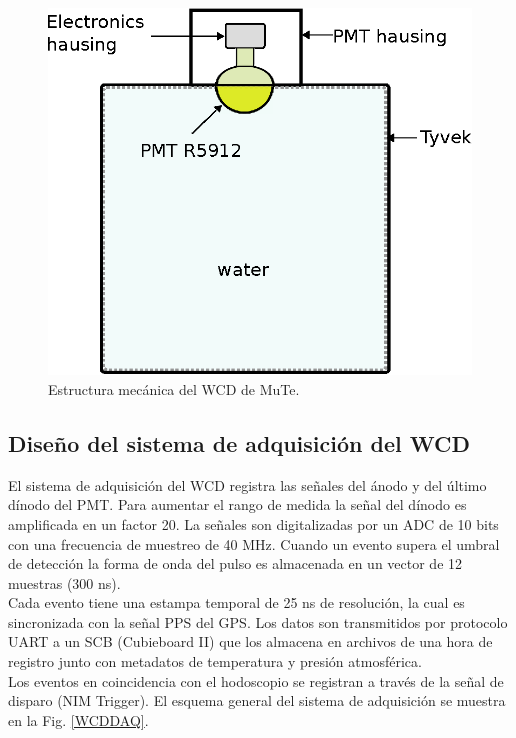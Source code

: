 \begin{figure}[h!]
\centering
\includegraphics[scale=1]{Figures/WCD.eps}
\caption{Estructura mecánica del WCD de MuTe.}
\label{WCD}
\end{figure}

\subsection{Diseño del sistema de adquisición del WCD}

El sistema de adquisición del WCD registra las señales del ánodo y del último dínodo del PMT. Para aumentar el rango de medida la señal del dínodo es amplificada en un factor 20. La señales son digitalizadas por un ADC de 10 bits con una frecuencia de muestreo de 40 MHz. Cuando un evento supera el umbral de detección la forma de onda del pulso es almacenada en un vector de 12 muestras (300 ns).\\

Cada evento tiene una estampa temporal de 25 ns de resolución, la cual es sincronizada con la señal PPS del GPS. Los datos son transmitidos por protocolo UART a un SCB (Cubieboard II) que los almacena en archivos de una hora de registro junto con metadatos de temperatura y presión atmosférica.\\

Los eventos en coincidencia con el hodoscopio se registran a través de la señal de disparo (NIM Trigger). El esquema general del sistema de adquisición se muestra en la Fig. \ref{WCDDAQ}.

